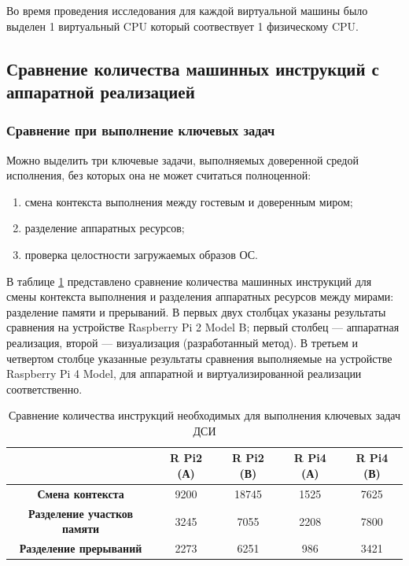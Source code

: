 Во время проведения исследования для каждой виртуальной машины было выделен 1 виртуальный CPU который соотвествует 1 физическому CPU.

\subsection{Сравнение количества машинных инструкций с аппаратной реализацией} 

\subsubsection{Сравнение при выполнение ключевых задач}

Можно выделить три ключевые задачи, выполняемых доверенной средой исполнения, без которых она не может считаться полноценной:

\begin{enumerate}[label*=\arabic*.]
	\item смена контекста выполнения между гостевым и доверенным миром;
	\item разделение аппаратных ресурсов;
	\item проверка целостности загружаемых образов ОС.
\end{enumerate}

В таблице \ref{table:perf-main-1} представлено сравнение количества машинных инструкций для смены контекста выполнения и разделения аппаратных ресурсов между мирами: разделение памяти и прерываний. В первых двух столбцах указаны результаты сравнения на устройстве Raspberry Pi 2 Model B; первый столбец --- аппаратная реализация, второй --- визуализация (разработанный метод). В третьем и четвертом столбце указанные результаты сравнения выполняемые на устройстве Raspberry Pi 4 Model, для аппаратной и виртуализированной реализации соответственно.

\begin{table}[!htb]
	\begin{center}
		\caption{Сравнение количества инструкций необходимых для выполнения ключевых задач ДСИ}
		\label{table:perf-main-1}
		\begin{tabular}{|c|c|c|c|c|}
			\hline
			& \bfseries R Pi2 (А) & \bfseries R Pi2 (В) & \bfseries R Pi4 (А) & \bfseries R Pi4 (В)\\
			\hline
			\bfseries Смена контекста & 9200 & 18745 & 1525 & 7625 \\ \hline
			\bfseries Разделение участков памяти & 3245 & 7055 & 2208 & 7800 \\ \hline
			\bfseries Разделение прерываний & 2273 & 6251 & 986 & 3421 \\ \hline	
		\end{tabular}
	\end{center}
\end{table}

